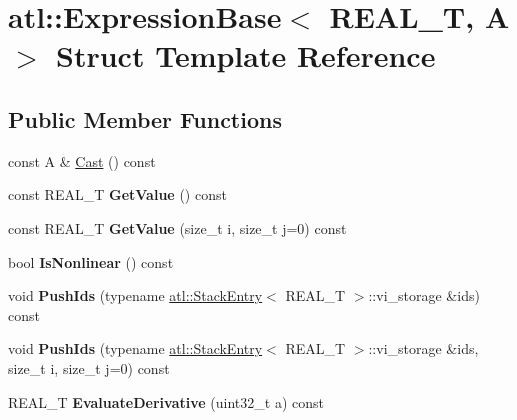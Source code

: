 \hypertarget{structatl_1_1_expression_base}{\section{atl\+:\+:Expression\+Base$<$ R\+E\+A\+L\+\_\+\+T, A $>$ Struct Template Reference}
\label{structatl_1_1_expression_base}
}
\subsection*{Public Member Functions}
\begin{DoxyCompactItemize}
\item 
const A \& \hyperlink{structatl_1_1_expression_base_a48c72f931e64d269c8721f940693ebda}{Cast} () const 
\item 
\hypertarget{structatl_1_1_expression_base_a5f19881cfcf10906ace851129d379bb1}{const R\+E\+A\+L\+\_\+\+T {\bfseries Get\+Value} () const }\label{structatl_1_1_expression_base_a5f19881cfcf10906ace851129d379bb1}

\item 
\hypertarget{structatl_1_1_expression_base_a2e4e10e53867b26cd638cfb588f90a50}{const R\+E\+A\+L\+\_\+\+T {\bfseries Get\+Value} (size\+\_\+t i, size\+\_\+t j=0) const }\label{structatl_1_1_expression_base_a2e4e10e53867b26cd638cfb588f90a50}

\item 
\hypertarget{structatl_1_1_expression_base_af31c04a9315fb7ab8d324f710592f1af}{bool {\bfseries Is\+Nonlinear} () const }\label{structatl_1_1_expression_base_af31c04a9315fb7ab8d324f710592f1af}

\item 
\hypertarget{structatl_1_1_expression_base_a4b69562e0847c41ddcc0dd2cc8b0613b}{void {\bfseries Push\+Ids} (typename \hyperlink{structatl_1_1_stack_entry}{atl\+::\+Stack\+Entry}$<$ R\+E\+A\+L\+\_\+\+T $>$\+::vi\+\_\+storage \&ids) const }\label{structatl_1_1_expression_base_a4b69562e0847c41ddcc0dd2cc8b0613b}

\item 
\hypertarget{structatl_1_1_expression_base_a4810cb822b3ad40d1a8105802e3dcad8}{void {\bfseries Push\+Ids} (typename \hyperlink{structatl_1_1_stack_entry}{atl\+::\+Stack\+Entry}$<$ R\+E\+A\+L\+\_\+\+T $>$\+::vi\+\_\+storage \&ids, size\+\_\+t i, size\+\_\+t j=0) const }\label{structatl_1_1_expression_base_a4810cb822b3ad40d1a8105802e3dcad8}

\item 
\hypertarget{structatl_1_1_expression_base_a88614881ee2f63ec83a6d5dd9d635863}{R\+E\+A\+L\+\_\+\+T {\bfseries Evaluate\+Derivative} (uint32\+\_\+t a) const }\label{structatl_1_1_expression_base_a88614881ee2f63ec83a6d5dd9d635863}


\end{DoxyCompactItemize}

